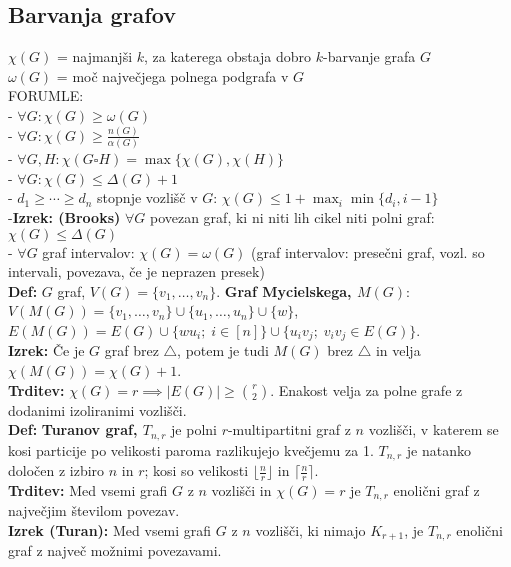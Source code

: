 \documentclass[a4paper,10pt]{article}
\theoremstyle{definition}
\let\oldtextbf\textbf
\renewcommand{\textbf}[1]{\oldtextbf{\boldmath #1}}
\begin{document}
\subsection*{Barvanja grafov}
\textbf{$\chi(G)$} = najmanjši $k$, za katerega obstaja dobro $k$-barvanje grafa $G$\\
\textbf{$\omega(G)$} = moč največjega polnega podgrafa v $G$\\
FORUMLE:\\
- $\forall G\colon \chi(G) \geq \omega(G)$\\
- $\forall G\colon \chi(G) \geq \frac{n(G)}{\alpha(G)}$\\
- $\forall G, H\colon \chi(G \square H) = \max\{\chi(G), \chi(H)\}$\\
- $\forall G\colon \chi(G) \leq \Delta(G) + 1$\\
- $d_1 \geq \cdots \geq d_n$ stopnje vozlišč v $G$: $\chi(G) \leq 1 + \max_i \min\{ d_i, i-1 \}$\\
-\textbf{Izrek: (Brooks)} $\forall G$ povezan graf, ki ni niti lih cikel niti polni graf: $\chi(G) \leq \Delta(G)$\\
- $\forall G$ graf intervalov: $\chi(G) = \omega(G)$ (graf intervalov: presečni graf, vozl. so intervali, povezava, če je neprazen presek)\\
\textbf{Def:} $G$ graf, $V(G) = \{v_1, \ldots, v_n\}$. \textbf{Graf Mycielskega, $M(G)$}: $V(M(G)) = \{v_1, \ldots, v_n\} \cup \{u_1, \ldots, u_n\} \cup \{w\}$, $E(M(G)) = E(G) \cup \{ wu_i; \; i \in [n] \} \cup \{ u_i v_j; \; v_i v_j \in E(G) \}$.\\
\textbf{Izrek:} Če je $G$ graf brez $\triangle$, potem je tudi $M(G)$ brez $\triangle$ in velja $\chi(M(G)) = \chi(G) + 1$.\\
\textbf{Trditev:} $\chi(G) = r \implies |E(G)| \geq \binom{r}{2}$. Enakost velja za polne grafe z dodanimi izoliranimi vozlišči.\\
\textbf{Def:} \textbf{Turanov graf, $T_{n, r}$} je polni $r$-multipartitni graf z $n$ vozlišči, v katerem se kosi particije po velikosti paroma razlikujejo kvečjemu za 1. $T_{n, r}$ je natanko določen z izbiro $n$ in $r$; kosi so velikosti $\lfloor \frac{n}{r} \rfloor$ in $\lceil \frac{n}{r} \rceil$.\\
\textbf{Trditev:} Med vsemi grafi $G$ z $n$ vozlišči in $\chi(G) = r$ je $T_{n, r}$ enolični graf z največjim številom povezav.\\
\textbf{Izrek (Turan):} Med vsemi grafi $G$ z $n$ vozlišči, ki nimajo $K_{r+1}$, je $T_{n,r}$ enolični graf z največ možnimi povezavami.
\end{document}
